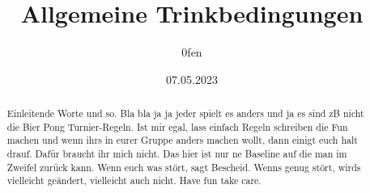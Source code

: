 \documentclass{article}
\title{Allgemeine Trinkbedingungen}
\author{0fen}
\date{07.05.2023}
\begin{document}


\maketitle
\begin{abstract}
	Einleitende Worte und so. Bla bla ja ja jeder spielt es anders und ja es sind zB nicht die Bier Pong Turnier-Regeln. Ist mir egal, lass einfach Regeln schreiben die Fun machen und wenn ihrs in eurer Gruppe anders machen wollt, dann einigt euch halt drauf. Dafür braucht ihr mich nicht. Das hier ist nur ne Baseline auf die man im Zweifel zurück kann. Wenn euch was stört, sagt Bescheid. Wenns genug stört, wirds vielleicht geändert, vielleicht auch nicht. Have fun take care.
\end{abstract}











\end{document}
